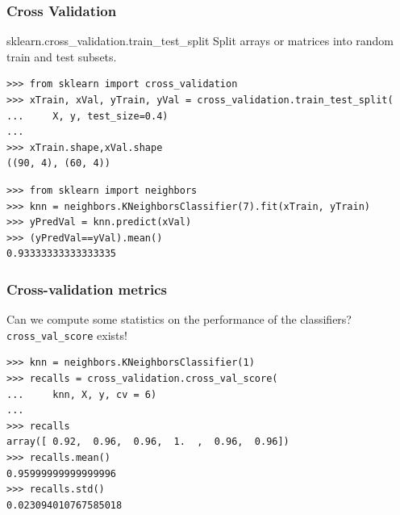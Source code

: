 \documentclass[10pt, colorlinks]{beamer}
\begin{document}
\begin{frame}[fragile]\frametitle{Cross Validation}
\begin{block}{sklearn.cross\_validation.train\_test\_split}
Split arrays or matrices into random train and test subsets.
\end{block}
\small
\begin{verbatim}
>>> from sklearn import cross_validation
>>> xTrain, xVal, yTrain, yVal = cross_validation.train_test_split(
...     X, y, test_size=0.4)
... 
>>> xTrain.shape,xVal.shape
((90, 4), (60, 4))
\end{verbatim}

\pause 
\begin{verbatim}
>>> from sklearn import neighbors
>>> knn = neighbors.KNeighborsClassifier(7).fit(xTrain, yTrain)
>>> yPredVal = knn.predict(xVal)
>>> (yPredVal==yVal).mean()
0.93333333333333335
\end{verbatim}

\end{frame}

\begin{frame}[fragile]\frametitle{Cross-validation metrics}
Can we compute some statistics on the performance of the classifiers? \verb|cross_val_score| exists! 
\begin{verbatim}
>>> knn = neighbors.KNeighborsClassifier(1)
>>> recalls = cross_validation.cross_val_score(
...     knn, X, y, cv = 6)
... 
>>> recalls
array([ 0.92,  0.96,  0.96,  1.  ,  0.96,  0.96])
>>> recalls.mean()
0.95999999999999996
>>> recalls.std()
0.023094010767585018
\end{verbatim}


\end{frame}
\end{document}
